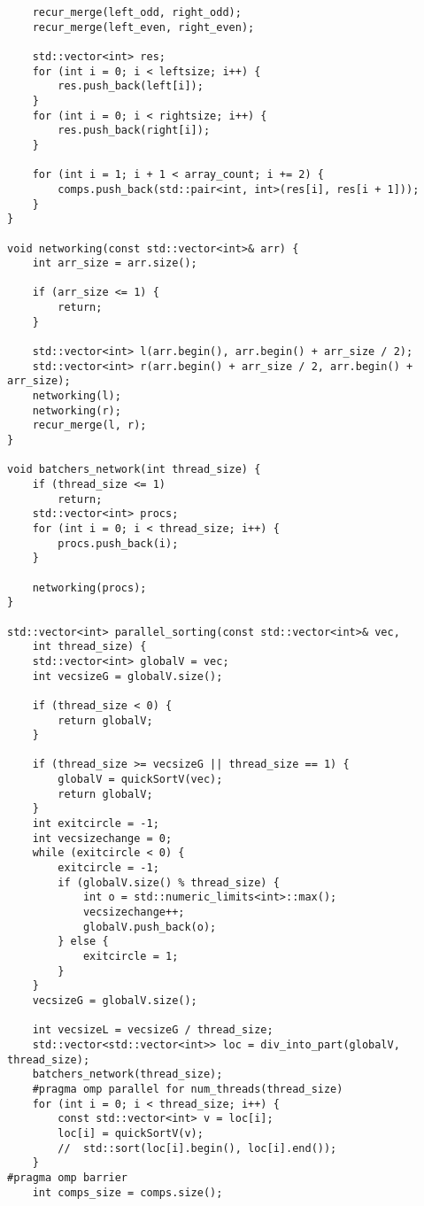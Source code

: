 \documentclass{report}
\begin{document}
\begin{lstlisting}
    recur_merge(left_odd, right_odd);
    recur_merge(left_even, right_even);

    std::vector<int> res;
    for (int i = 0; i < leftsize; i++) {
        res.push_back(left[i]);
    }
    for (int i = 0; i < rightsize; i++) {
        res.push_back(right[i]);
    }

    for (int i = 1; i + 1 < array_count; i += 2) {
        comps.push_back(std::pair<int, int>(res[i], res[i + 1]));
    }
}

void networking(const std::vector<int>& arr) {
    int arr_size = arr.size();

    if (arr_size <= 1) {
        return;
    }

    std::vector<int> l(arr.begin(), arr.begin() + arr_size / 2);
    std::vector<int> r(arr.begin() + arr_size / 2, arr.begin() + arr_size);
    networking(l);
    networking(r);
    recur_merge(l, r);
}

void batchers_network(int thread_size) {
    if (thread_size <= 1)
        return;
    std::vector<int> procs;
    for (int i = 0; i < thread_size; i++) {
        procs.push_back(i);
    }

    networking(procs);
}

std::vector<int> parallel_sorting(const std::vector<int>& vec,
    int thread_size) {
    std::vector<int> globalV = vec;
    int vecsizeG = globalV.size();

    if (thread_size < 0) {
        return globalV;
    }

    if (thread_size >= vecsizeG || thread_size == 1) {
        globalV = quickSortV(vec);
        return globalV;
    }
    int exitcircle = -1;
    int vecsizechange = 0;
    while (exitcircle < 0) {
        exitcircle = -1;
        if (globalV.size() % thread_size) {
            int o = std::numeric_limits<int>::max();
            vecsizechange++;
            globalV.push_back(o);
        } else {
            exitcircle = 1;
        }
    }
    vecsizeG = globalV.size();

    int vecsizeL = vecsizeG / thread_size;
    std::vector<std::vector<int>> loc = div_into_part(globalV, thread_size);
    batchers_network(thread_size);
    #pragma omp parallel for num_threads(thread_size)
    for (int i = 0; i < thread_size; i++) {
        const std::vector<int> v = loc[i];
        loc[i] = quickSortV(v);
        //  std::sort(loc[i].begin(), loc[i].end());
    }
#pragma omp barrier
    int comps_size = comps.size();


\end{lstlisting}
\end{document}
